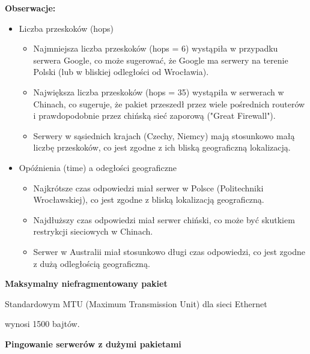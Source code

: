 \documentclass{article}
\begin{document}
\vspace{5\baselineskip}

\textbf{Obserwacje: }

\vspace{1\baselineskip}
\begin{itemize}
  \item Liczba przeskoków (hops)
    \begin{itemize}
      \item Najmniejsza liczba przeskoków (hops = 6) wystąpiła w przypadku serwera Google, co może sugerować, że Google ma serwery na terenie Polski (lub w bliskiej odległości od Wrocławia).
      \item Największa liczba przeskoków (hops = 35) wystąpiła w serwerach w Chinach, co sugeruje, że pakiet przeszedł przez wiele pośrednich routerów i prawdopodobnie przez chińską sieć zaporową ("Great Firewall").
      \item Serwery w sąsiednich krajach (Czechy, Niemcy) mają stosunkowo małą liczbę przeskoków, co jest zgodne z ich bliską geograficzną lokalizacją.
    \end{itemize}

  \item Opóźnienia (time) a odegłości geograficzne
    \begin{itemize}
      \item Najkrótsze czas odpowiedzi miał serwer w Polsce (Politechniki Wrocławskiej), co jest zgodne z bliską lokalizacją geograficzną.
      \item Najdłuższy czas odpowiedzi miał serwer chiński, co może być skutkiem restrykcji sieciowych w Chinach.
      \item Serwer w Australii miał stosunkowo długi czas odpowiedzi, co jest zgodne z dużą odległością geograficzną.
    \end{itemize}
\end{itemize}

\vspace{1\baselineskip}

\textbf{Maksymalny niefragmentowany pakiet} \newline

Standardowym MTU (Maximum Transmission Unit) dla sieci Ethernet \par wynosi 1500 bajtów.

\vspace{1\baselineskip}
\textbf{Pingowanie serwerów z dużymi pakietami}
\end{document}
